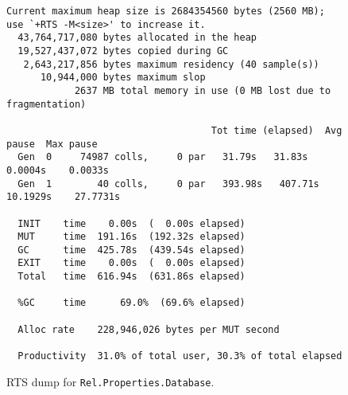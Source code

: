 \begin{figure}[h]
\begin{center}
\scriptsize
\begin{verbatim}
Current maximum heap size is 2684354560 bytes (2560 MB);
use `+RTS -M<size>' to increase it.
  43,764,717,080 bytes allocated in the heap
  19,527,437,072 bytes copied during GC
   2,643,217,856 bytes maximum residency (40 sample(s))
      10,944,000 bytes maximum slop
            2637 MB total memory in use (0 MB lost due to fragmentation)

                                    Tot time (elapsed)  Avg pause  Max pause
  Gen  0     74987 colls,     0 par   31.79s   31.83s     0.0004s    0.0033s
  Gen  1        40 colls,     0 par   393.98s   407.71s     10.1929s    27.7731s

  INIT    time    0.00s  (  0.00s elapsed)
  MUT     time  191.16s  (192.32s elapsed)
  GC      time  425.78s  (439.54s elapsed)
  EXIT    time    0.00s  (  0.00s elapsed)
  Total   time  616.94s  (631.86s elapsed)

  %GC     time      69.0%  (69.6% elapsed)

  Alloc rate    228,946,026 bytes per MUT second

  Productivity  31.0% of total user, 30.3% of total elapsed
\end{verbatim}
\end{center}
\caption{RTS dump for \texttt{\small Rel.Properties.Database}.}
\label{fig:rtsdump}
\end{figure}



